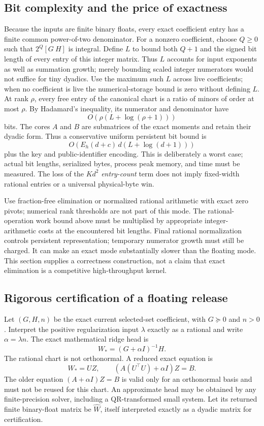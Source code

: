 \documentclass[11pt,a4paper]{article}
\begin{document}
\subsection{Bit complexity and the price of exactness}
Because the inputs are finite binary floats, every exact coefficient entry
has a finite common power-of-two denominator. For a nonzero coefficient,
choose $Q\ge0$ such that $2^Q[G\ H]$ is integral. Define $L$ to bound
both $Q+1$ and the signed bit length of every entry of this integer matrix.
Thus $L$ accounts for input exponents as well as summation growth; merely
bounding scaled integer numerators would not suffice for tiny dyadics.
Use the maximum such $L$ across live coefficients; when no coefficient is
live the numerical-storage bound is zero without defining $L$.
At rank $\rho$, every free
entry of the canonical chart is a ratio of minors of order at most
$\rho$. By Hadamard's inequality, its numerator and denominator have
\[
 O\!\left(\rho(L+\log(\rho+1))\right)
\]
bits. The cores $A$ and $B$ are submatrices of the exact moments and retain
their dyadic form. Thus a conservative uniform persistent bit bound is
\[
 O\!\left(E_h(d+c)\,d(L+\log(d+1))\right)
\]
plus the key and public-identifier encoding. This is deliberately a worst
case; actual bit lengths, serialized bytes, process peak memory, and time
must be measured. The loss of the $K d^2$ \emph{entry-count} term does not
imply fixed-width rational entries or a universal physical-byte win.

Use fraction-free elimination or normalized rational arithmetic with exact
zero pivots; numerical rank thresholds are not part of this mode. The
rational-operation work bound above must be multiplied by appropriate
integer-arithmetic costs at the encountered bit lengths. Final rational
normalization controls persistent representation; temporary numerator growth
must still be charged. It can make an exact mode substantially slower than
the floating mode. This section supplies a correctness construction, not a
claim that exact elimination is a competitive high-throughput kernel.

\subsection{Rigorous certification of a floating release}
Let $(G,H,n)$ be the exact current selected-set coefficient, with
$G\succeq0$ and $n>0$. Interpret the positive regularization input
$\lambda$ exactly as a rational and write $\alpha=\lambda n$. The exact
mathematical ridge head is
\[
 W_*=(G+\alpha I)^{-1}H.
\]
The rational chart is not orthonormal. A reduced exact equation is
\[
 W_*=UZ,\qquad (A(U^\top U)+\alpha I)Z=B.
\]
The older equation $(A+\alpha I)Z=B$ is valid only for an orthonormal basis
and must not be reused for this chart. An approximate head may be obtained
by any finite-precision solver, including a QR-transformed small system.
Let its returned finite binary-float matrix be $\widehat W$, itself
interpreted exactly as a dyadic matrix for certification.
\end{document}
